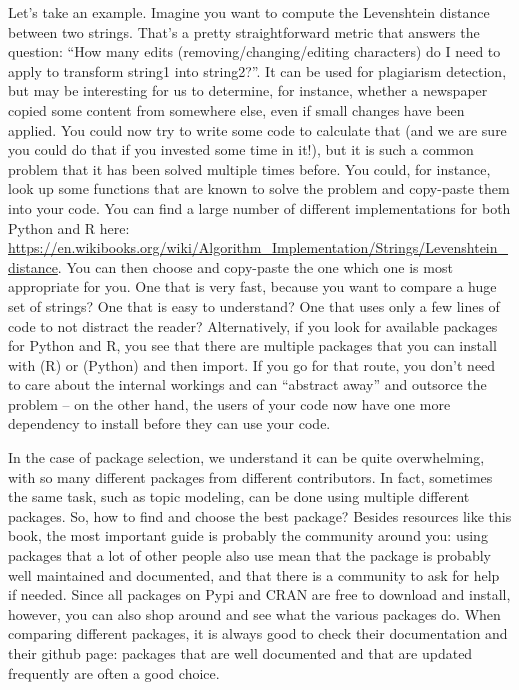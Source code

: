 Let's take an example. Imagine you want to compute the Levenshtein distance between two
strings. That's a pretty straightforward metric that answers the question: ``How many
edits (removing/changing/editing characters) do I need to apply to transform string1 into string2?''.
It can be used for plagiarism detection, but may be interesting for us to determine, for instance,
whether a newspaper copied some content from somewhere else, even if small changes have been
applied. You could now try to write some code to calculate that (and we are sure you could
do that if you invested some time in it!), but it is such a common problem that it
has been solved multiple times before. You could, for instance,  look up some
functions that are known to solve the problem and copy-paste them into your code. You can find
a large number of different implementations for both Python and R here:
\url{https://en.wikibooks.org/wiki/Algorithm_Implementation/Strings/Levenshtein\_distance}.
You can then choose and copy-paste the one which one is most appropriate for you. One that is very fast, because
you want to compare a huge set of strings? One that is easy to understand? One that uses
only a few lines of code to not distract the reader?
Alternatively, if you look for available packages for Python and R, you see that there are
multiple packages that you can install with  (R) or  (Python)
and then import. If you go for that route, you don't need
to care about the internal workings and can ``abstract away'' and outsorce the problem -- on the other
hand, the users of your code now have one more dependency to install before they can
use your code.

In the case of package selection, we understand it can be quite overwhelming,
with so many different packages from different contributors.
In fact, sometimes the same task, such as topic modeling,
can be done using multiple different packages.
So, how to find and choose the best package?
Besides resources like this book, the most important guide is probably the community around you:
using packages that a lot of other people also use mean that the package is probably well maintained and documented,
and that there is a community to ask for help if needed.
Since all packages on Pypi and CRAN are free to download and install, however, you can also shop around and see what the various packages do.
When comparing different packages, it is always good to check their documentation and their github page:
packages that are well documented and that are updated frequently are often a good choice.

